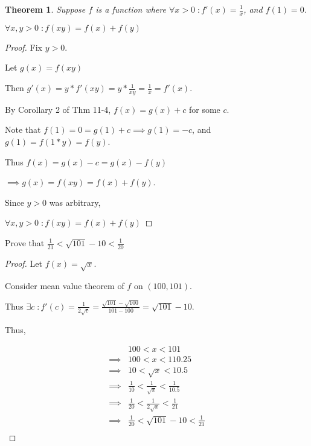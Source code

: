 \documentclass{article} %
\theoremstyle{plain}
\newtheorem*{theorem*}{Theorem}
\theoremstyle{definition}
\begin{document}
\begin{theorem*}
    Suppose $f$ is a function where $\forall x > 0 \; \colon f'(x) = \frac{1}{x}$, and $f(1) = 0$.

    $\forall x,y > 0 \; \colon f(xy) = f(x) + f(y)$
\end{theorem*}

\begin{proof}
    Fix $y > 0$.

    Let $g(x) = f(xy)$

    Then $g'(x) = y * f'(xy) = y * \frac{1}{xy} = \frac{1}{x} = f'(x)$.

    By Corollary 2 of Thm 11-4, $f(x) = g(x) + c$ for some $c$.

    Note that $f(1) = 0 = g(1) + c \implies g(1) = -c$, and $g(1) = f(1 * y) = f(y)$.

    Thus $f(x) = g(x) - c = g(x) - f(y)$

    $\implies g(x) = f(xy) = f(x) + f(y)$.

    Since $y > 0$ was arbitrary,

    $\forall x,y > 0 \; \colon f(xy) = f(x) + f(y)$
\end{proof}


\noindent{} Prove that $ \frac{1}{21}  < \sqrt{101} - 10 < \frac{1}{20}$

\begin{proof}
    Let $f(x) = \sqrt{x}$.

    Consider mean value theorem of $f$ on $(100,101)$.

    Thus $\exists c \; \colon f'(c) = \frac{1}{2 \sqrt{c}} = \frac{\sqrt{101} - \sqrt{100}}{101 - 100} = \sqrt{101} - 10$.

    Thus,
    
    \begin{align*}
        & 100 < x < 101 \\
        \implies & 100 < x < 110.25 \\
        \implies & 10 < \sqrt{x} < 10.5 \\
        \implies & \frac{1}{10} < \frac{1}{\sqrt{x}} < \frac{1}{10.5} \\
        \implies & \frac{1}{20} < \frac{1}{2 \sqrt{x}} < \frac{1}{21} \\
        \implies & \frac{1}{20} < \sqrt{101} - 10 < \frac{1}{21} \\
    \end{align*}
\end{proof}
\end{document}
